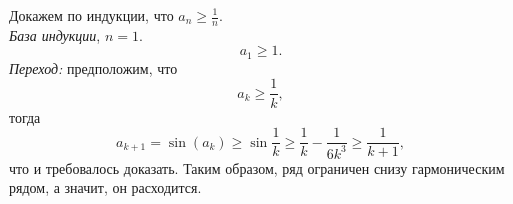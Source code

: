 \documentclass{article}
\begin{document}
Докажем по индукции, что $a_n \geqslant \frac1n$.\\
\textit{База индукции}, $n=1$.\\
$$a_1 \geqslant 1.$$
\textit{Переход:} предположим, что
$$a_k \geqslant \frac1k,$$
тогда
$$a_{k+1} = \sin (a_k) \geqslant \sin \frac1k \geqslant \frac1k - \frac{1}{6k^3} \geqslant \frac{1}{k+1},$$
что и требовалось доказать.
Таким образом, ряд ограничен снизу гармоническим рядом, а значит, он расходится.
\end{document}
